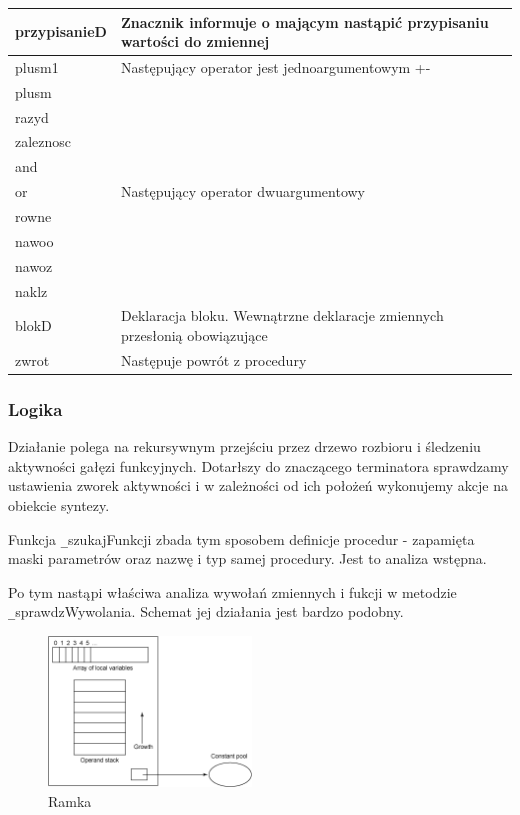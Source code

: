 \documentclass[a4paper,12pt]{article}
\begin{document}
\begin{longtable}{|l|l|}
  \hline
  przypisanieD & Znacznik informuje o mającym nastąpić przypisaniu wartości do zmiennej\\
  \hline
  plusm1 & Następujący operator jest jednoargumentowym +-\\
  \hline
  plusm & \multirow{9}{*}{Następujący operator dwuargumentowy} \\
  razyd & \\
  zaleznosc & \\
  and & \\
  or & \\
  rowne & \\
  nawoo & \\
  nawoz & \\
  naklz & \\
  \hline
  blokD & Deklaracja bloku. Wewnątrzne deklaracje zmiennych przesłonią obowiązujące\\
  \hline
  zwrot & Następuje powrót z procedury\\
  \hline
\end{longtable}

\subsubsection{Logika}
Działanie polega na rekursywnym przejściu przez drzewo rozbioru i śledzeniu aktywności gałęzi funkcyjnych. Dotarłszy do znaczącego terminatora sprawdzamy ustawienia zworek aktywności i w zależności od ich położeń wykonujemy akcje na obiekcie syntezy.

Funkcja \verb|_|szukajFunkcji zbada tym sposobem definicje procedur - zapamięta maski parametrów oraz nazwę i typ samej procedury. Jest to analiza wstępna. 



Po tym nastąpi właściwa analiza wywołań zmiennych i fukcji w metodzie \verb|_|sprawdzWywolania. Schemat jej działania jest bardzo podobny.

\begin{figure}
  \begin{center}
    \includegraphics[scale=0.5,width=0.48\textwidth]{grafika/vm.png}
  \end{center}
  \caption{Ramka}
\end{figure}
\end{document}
